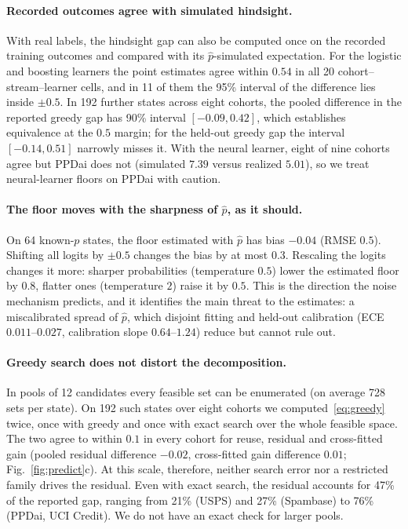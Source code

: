 \documentclass[runningheads]{llncs}
\begin{document}
\paragraph{Recorded outcomes agree with simulated hindsight.} With real labels, the hindsight gap can also be computed once on the recorded training outcomes and compared with its $\hat p$-simulated expectation. For the logistic and boosting learners the point estimates agree within $0.54$ in all 20 cohort--stream--learner cells, and in 11 of them the 95\% interval of the difference lies inside $\pm0.5$. In 192 further states across eight cohorts, the pooled difference in the reported greedy gap has 90\% interval $[-0.09,0.42]$, which establishes equivalence at the $0.5$ margin; for the held-out greedy gap the interval $[-0.14,0.51]$ narrowly misses it. With the neural learner, eight of nine cohorts agree but PPDai does not (simulated $7.39$ versus realized $5.01$), so we treat neural-learner floors on PPDai with caution.

\paragraph{The floor moves with the sharpness of $\hat p$, as it should.} On 64 known-$p$ states, the floor estimated with $\hat p$ has bias $-0.04$ (RMSE $0.5$). Shifting all logits by $\pm0.5$ changes the bias by at most $0.3$. Rescaling the logits changes it more: sharper probabilities (temperature $0.5$) lower the estimated floor by $0.8$, flatter ones (temperature $2$) raise it by $0.5$. This is the direction the noise mechanism predicts, and it identifies the main threat to the estimates: a miscalibrated spread of $\hat p$, which disjoint fitting and held-out calibration (ECE $0.011$--$0.027$, calibration slope $0.64$--$1.24$) reduce but cannot rule out.

\paragraph{Greedy search does not distort the decomposition.} In pools of 12 candidates every feasible set can be enumerated (on average 728 sets per state). On 192 such states over eight cohorts we computed~\eqref{eq:greedy} twice, once with greedy and once with exact search over the whole feasible space. The two agree to within $0.1$ in every cohort for reuse, residual and cross-fitted gain (pooled residual difference $-0.02$, cross-fitted gain difference $0.01$; Fig.~\ref{fig:predict}c). At this scale, therefore, neither search error nor a restricted family drives the residual. Even with exact search, the residual accounts for 47\% of the reported gap, ranging from 21\% (USPS) and 27\% (Spambase) to 76\% (PPDai, UCI Credit). We do not have an exact check for larger pools.
\end{document}
